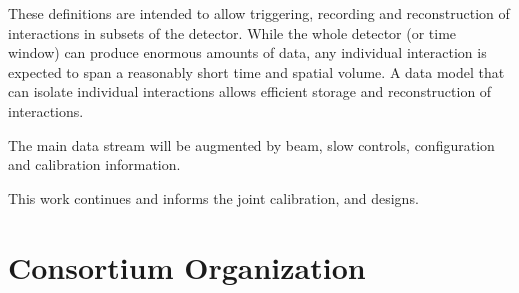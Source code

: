   These definitions are intended to allow triggering, recording and reconstruction of interactions in subsets of the detector. While the whole detector (or time window) can produce enormous amounts of data, any individual interaction is expected to span a reasonably short time and spatial volume. A data model that can isolate individual interactions  allows efficient storage and reconstruction of interactions.


  The main data stream will be augmented by beam, slow controls,  configuration and calibration information.

  This work continues and informs  the  joint  calibration,  and  designs.


  \section{Consortium Organization}













